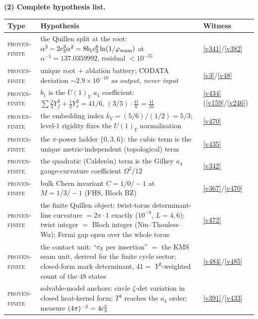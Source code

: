 \par\smallskip\noindent\textbf{(2) Complete hypothesis list.}
\begin{center}\footnotesize
\renewcommand{\arraystretch}{1.22}
\begin{tabularx}{\linewidth}{@{}l>{\hsize=1.45\hsize\raggedright\arraybackslash}X>{\hsize=0.55\hsize\raggedright\arraybackslash}X@{}}
\toprule
\textbf{Type} & \textbf{Hypothesis} & \textbf{Witness} \\
\midrule
\textsc{proven-finite} & the Quillen split at the root: $\alpha^3-2c_3^3\alpha^2=8b_1c_3^6\ln(1/\varphi_{\mathrm{seam}})$ at $\alpha^{-1}=137.0359992$, residual $<10^{-35}$ & \vref{v341}/\vref{v382} \\
\textsc{proven-finite} & unique root $+$ ablation battery; CODATA deviation $\sim2.9\times10^{-10}$ \emph{as output, never input} & \vref{v3}/\vref{v48} \\
\textsc{proven-finite} & $b_1$ is the $U(1)_Y$ $a_4$ coefficient: $\sum\tfrac23Y_f^2+\tfrac13Y_s^2=41/6$, $(3/5)\cdot\tfrac{41}6=\tfrac{41}{10}$ & \vref{v434} (\vref{v159}/\vref{v246}) \\
\textsc{proven-finite} & the embedding index $k_Y=(5/6)/(1/2)=5/3$; level-$1$ rigidity fixes the $U(1)_Y$ normalisation & \vref{v470} \\
\textsc{proven-finite} & the $\pi$-power ladder $\{0,3,6\}$: the cubic term is the unique metric-independent (topological) term & \vref{v435} \\
\textsc{proven-finite} & the quadratic (Calder\'on) term is the Gilkey $a_4$ gauge-curvature coefficient $\Omega^2/12$ & \vref{v342} \\
\textsc{proven-finite} & bulk Chern invariant $C=1/0/-1$ at $M=1/3/-1$ (FHS, Bloch BZ) & \vref{v367}/\vref{v470} \\
\textsc{proven-finite} & the finite Quillen object: twist-torus determinant-line curvature $=2\pi\cdot1$ exactly ($10^{-9}$, $L=4,6$); twist integer $=$ Bloch integer (Niu--Thouless--Wu); Fermi gap open over the whole torus & \vref{v472} \\
\textsc{proven-finite} & the contact unit: ``$c_3$ per insertion'' $=$ the KMS seam unit, derived for the finite cycle sector; closed-form mark determinant, $41=$ $Y^2$-weighted count of the $48$ states & \vref{v484}/\vref{v485} \\
\textsc{proven-finite} & solvable-model anchors: circle $\zeta$-det variation in closed heat-kernel form; $T^4$ reaches the $a_4$ order; measure $(4\pi)^{-2}=4c_3^2$ & \vref{v391}/\vref{v433} \\

\end{tabularx}
\end{center}
